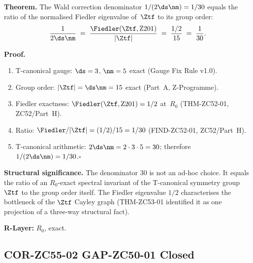 \documentclass[12pt, a4paper]{article}
\begin{document}
\begin{formalbox}[title={THM-ZC55-02: Spectral Denominator Theorem
  (closes GAP-ZC50-01) --- $R_0$, Exact}]
\textbf{Theorem.}
The Wald correction denominator $1/(2\ds\nm)=1/30$ equals the ratio
of the normalised Fiedler eigenvalue of~$\Ztf$ to its group order:
\begin{equation}
  \frac{1}{2\ds\nm}
  \;=\; \frac{\Fiedler(\Ztf,\mathrm{Z201})}{|\Ztf|}
  \;=\; \frac{1/2}{15}
  \;=\; \frac{1}{30}.
  \label{eq:spectral-denom}
\end{equation}

\textbf{Proof.}
\begin{enumerate}[leftmargin=2em, noitemsep]
\item T-canonical gauge: $\ds=3$, $\nm=5$ exact
  (Gauge Fix Rule v1.0).
\item Group order: $|\Ztf|=\ds\nm=15$ exact
  (Part~A, Z-Programme).
\item Fiedler exactness: $\Fiedler(\Ztf,\mathrm{Z201})=1/2$
  at~$R_0$ (THM-ZC52-01, ZC52/Part~H).
\item Ratio: $\Fiedler/|\Ztf|=(1/2)/15=1/30$
  (FIND-ZC52-01, ZC52/Part~H).
\item T-canonical arithmetic: $2\ds\nm=2\cdot3\cdot5=30$;
  therefore $1/(2\ds\nm)=1/30$.\hfill$\square$
\end{enumerate}

\medskip
\textbf{Structural significance.}
The denominator $30$ is not an ad-hoc choice.  It equals the ratio
of an $R_0$-exact spectral invariant of the T-canonical symmetry
group~$\Ztf$ to the group order itself.  The Fiedler eigenvalue
$1/2$ characterises the bottleneck of the $\Ztf$ Cayley graph
(THM-ZC53-01 identified it as one projection of a three-way
structural fact).

\textbf{R-Layer:} $R_0$, exact.
\end{formalbox}

\subsection{COR-ZC55-02 \quad GAP-ZC50-01 Closed}
\label{sec:cor02}

\end{document}

